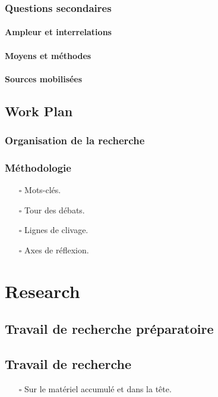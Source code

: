 \documentclass[paper=A4,portrait,twoside=true,twocolumn=false,headinclude=false,footinclude=false,fontsize=11,BCOR=15mm,DIV=calc,pagesize=auto,titlepage=firstiscover,mpinclude=true,headings=big,headings=twolinechapter,open=right,chapterprefix=false,headsepline=false,parskip=full]{scrbook}
\begin{document}
\section{Questions secondaires}
\label{sec:org177628a}
\subsection{Ampleur et interrelations}
\label{sec:org1a30270}
\subsection{Moyens et méthodes}
\label{sec:org8378bdd}
\subsection{Sources mobilisées}
\label{sec:org6cd2895}
\chapter{Work Plan}
\label{sec:org83ca968}
\section{Organisation de la recherche}
\label{sec:org2b82d6f}
\section{Méthodologie}
\label{sec:org731153c}
\begin{itemize}
\item[{$\square$}] Mots-clés.
\item[{$\square$}] Tour des débats.
\item[{$\square$}] Lignes de clivage.
\item[{$\square$}] Axes de réflexion.
\end{itemize}
\part{Research}
\label{sec:orgd9ccaf5}
\chapter{Travail de recherche préparatoire}
\label{sec:orgc3551f8}
\chapter{Travail de recherche}
\label{sec:org7a441cc}
\begin{itemize}
\item[{$\square$}] Sur le matériel accumulé et dans la tête.
\end{itemize}
\end{document}
